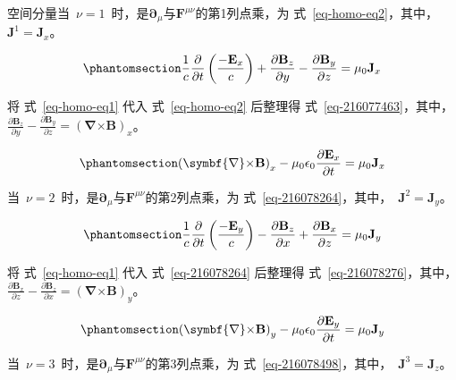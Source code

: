 \documentclass[
  chinese,
  a4paper,
  UTF8,
  12pt,
  oneside,
  openany]{ctexbook}
\begin{document}
空间分量当~\(\nu = 1\)~时，是\(\symbf{\partial}_{\mu}\)与\(\mathbf{F}^{\mu\nu}\)的第1列点乘，为
式~\ref{eq-homo-eq2}，其中，~\(\mathbf{J}^{1} = \mathbf{J}_{x}\)。

\begin{equation}\protect\phantomsection\label{eq-homo-eq2}{
\frac{1}{c}\frac{\partial}{\partial t}\left( \frac{{- \mathbf{E}}_{x}}{c} \right) + \frac{\partial\mathbf{B}_{z}}{\partial y} - \frac{\partial\mathbf{B}_{y}}{\partial z} = \mu_{0}\mathbf{J}_{x}
}\end{equation}

将 式~\ref{eq-homo-eq1} 代入 式~\ref{eq-homo-eq2} 后整理得
式~\ref{eq-216077463}，其中，\(\frac{\partial\mathbf{B}_{z}}{\partial y} - \frac{\partial\mathbf{B}_{y}}{\partial z} = \left( \symbf{\nabla}\mathbf{\times B} \right)_{x}\)。

\begin{equation}\protect\phantomsection\label{eq-216077463}{
\left( \symbf{\nabla}\mathbf{\times B} \right)_{x} - \mu_{0}\epsilon_{0}\frac{\partial\mathbf{E}_{x}}{\partial t} = \mu_{0}\mathbf{J}_{x}
}\end{equation}

当~\(\nu = 2\)~时，是\(\symbf{\partial}_{\mu}\)与\(\mathbf{F}^{\mu\nu}\)的第2列点乘，为
式~\ref{eq-216078264}，其中，~\(\mathbf{J}^{2} = \mathbf{J}_{y}\)。

\begin{equation}\protect\phantomsection\label{eq-216078264}{
\frac{1}{c}\frac{\partial}{\partial t}\left( \frac{{- \mathbf{E}}_{y}}{c} \right) - \frac{\partial\mathbf{B}_{z}}{\partial x} + \frac{\partial\mathbf{B}_{x}}{\partial z} = \mu_{0}\mathbf{J}_{y}
}\end{equation}

将 式~\ref{eq-homo-eq1} 代入 式~\ref{eq-216078264} 后整理得
式~\ref{eq-216078276}，其中，\(\frac{\partial\mathbf{B}_{x}}{\partial z} - \frac{\partial\mathbf{B}_{z}}{\partial x} = \left( \symbf{\nabla}\mathbf{\times B} \right)_{y}\)。

\begin{equation}\protect\phantomsection\label{eq-216078276}{
\left( \symbf{\nabla}\mathbf{\times B} \right)_{y} - \mu_{0}\epsilon_{0}\frac{\partial\mathbf{E}_{y}}{\partial t} = \mu_{0}\mathbf{J}_{y}
}\end{equation}

当~\(\nu = 3\)~时，是\(\symbf{\partial}_{\mu}\)与\(\mathbf{F}^{\mu\nu}\)的第3列点乘，为
式~\ref{eq-216078498}，其中，~\(\mathbf{J}^{3} = \mathbf{J}_{z}\)。
\end{document}
